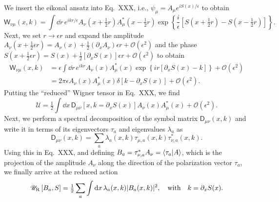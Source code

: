 We insert the eikonal ansatz into Eq.~XXX, i.e., $\psi_{\mu} = A_{\mu}e^{iS(x)/\epsilon}$ to obtain%
%
\begin{equation}
    \mathsf{W}_{\nu\mu}(x, k) = \int \dd{r}\,e^{ikr/\epsilon} A_{\nu}\left(x + \tfrac{1}{2} r\right)A_{\mu}^{*}\left(x - \tfrac{1}{2} r\right)\exp\left\{\frac{i}{\epsilon}\left[S\left(x + \tfrac{1}{2} r\right) - S\left(x - \tfrac{1}{2} r\right)\right]\right\}.
\end{equation}
%
Next, we set $r \to \epsilon r$ and expand the amplitude $A_{\nu}(x + \frac{1}{2}\epsilon r) = A_{\nu}(x) + \frac{1}{2}(\partial_{x}A_{\nu})\epsilon r + \mathcal{O}(\epsilon^{2})$ and the phase $S(x + \frac{1}{2}\epsilon r) = S(x) + \frac{1}{2}[\partial_{x}S(x)]\epsilon r + \mathcal{O}(\epsilon^{2})$ to obtain
%
\begin{equation}
  \begin{aligned}
    \mathsf{W}_{\nu\mu}(x, k) &= \epsilon\int \dd{r}\,e^{ikr} A_{\nu}(x)A_{\mu}^{*}(x)\exp\left\{ir\left[\partial_{x}S(x) - k\right]\right\} + \mathcal{O}(\epsilon^{2}) \\
                        &= 2\pi\epsilon A_{\nu}(x)A^{*}_{\mu}(x)\delta\left[k - \partial_{x}S(x)\right] + \mathcal{O}(\epsilon^{2}).
  \end{aligned}
\end{equation}
%
Putting the ``reduced'' Wigner tensor in Eq.~XXX, we find
%
\begin{equation}
  \mathscr{U} = \tfrac{1}{2}\int \dd{x}\, \mathsf{D}_{\mu\nu}\left[x, k=\partial_{x}S(x)\right]A_{\nu}(x)A^{*}_{\mu}(x) + \mathcal{O}(\epsilon^{2}).
\end{equation}
%
Next, we perform a spectral decomposition of the symbol matrix $\mathsf{D}_{\mu\nu}(x, k)$ and write it in terms of its eigenvectors $\tau_{a}$ and eigenvalues $\lambda_{a}$ as
%
\begin{equation}
  \mathsf{D}_{\mu\nu}(x, k) = \sum_{a} \lambda_{a}(x, k) \tau_{\mu, a}(x, k) \tau_{\nu, a}^{*}(x, k).
\end{equation}
%
Using this in Eq.~XXX, and defining $B_{a} = \tau_{\nu, a}^{*}A_{\nu} = \mathinner{\langle{\tau_{a}|A}\rangle}$, which is the projection of the amplitude $A_{\nu}$ along the direction of the polarization vector $\tau_{a}$, we finally arrive at the reduced action
%
\begin{equation}
  \mathscr{U}_{\text{R}}\left[B_{a}, S\right] = \tfrac{1}{2} \sum_{a} \int \mathrm{d}{x}\, \lambda_{a}(x,k) \lvert B_{a}(x, k)\rvert^{2},
  \quad\text{with}\quad
  k = \partial_{x}S(x).
\end{equation}
%

